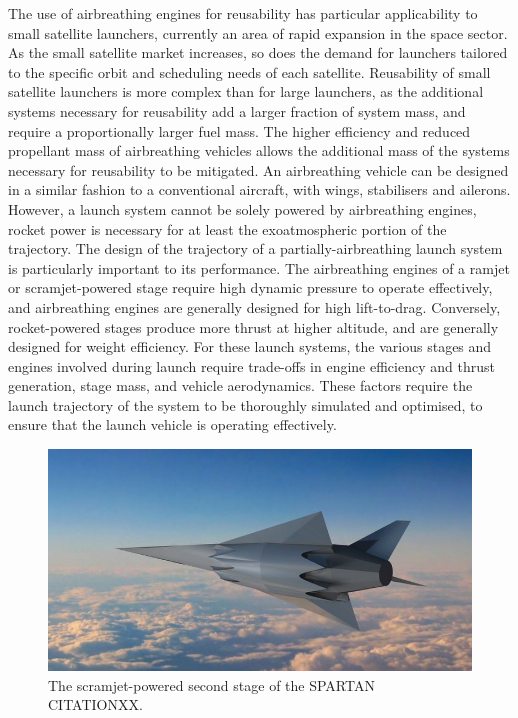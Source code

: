   	 The use of airbreathing engines for reusability has particular applicability to small satellite launchers, currently an area of rapid expansion in the space sector. 
  	 As the small satellite market increases, so does the demand for launchers tailored to the specific orbit and scheduling needs of each satellite. Reusability of small satellite launchers is more complex than for large launchers, as the additional systems necessary for reusability add a larger fraction of system mass, and require a proportionally larger fuel mass. 
  	 The higher efficiency and reduced propellant mass of airbreathing vehicles allows the additional mass of the systems necessary for reusability to be mitigated. An airbreathing vehicle can be designed in a similar fashion to a conventional aircraft, with wings, stabilisers and ailerons. However, a launch system cannot be solely powered by airbreathing engines, rocket power is necessary for at least the exoatmospheric portion of the trajectory. The design of the trajectory of a partially-airbreathing launch system is particularly important to its performance. 
  	   The airbreathing engines of a ramjet or scramjet-powered stage require high dynamic pressure to operate effectively, and airbreathing engines are generally designed for high lift-to-drag. Conversely, rocket-powered stages produce more thrust at higher altitude, and are generally designed for weight efficiency. For these launch systems, the various stages and engines involved during launch require trade-offs in engine efficiency and thrust generation, stage mass, and vehicle aerodynamics. These factors require the launch trajectory of the system to be thoroughly simulated and optimised, to ensure that the launch vehicle is operating effectively. 
 	  
  	  	\begin{figure}[ht]
  	  		\centering
  	  		\includegraphics[width=0.7\linewidth]{figures/1_introduction/project-spartan}
  	  		\caption{The scramjet-powered second stage of the SPARTAN CITATIONXX.}
  	  		\label{fig:project-spartan}
  	  	\end{figure}
  	  	


